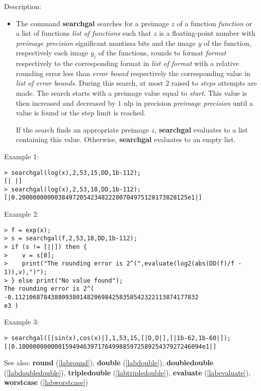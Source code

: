 \noindent Description: \begin{itemize}

\item The command \textbf{searchgal} searches for a preimage $z$ of a function
   \emph{function} or a list of functions \emph{list of functions} such that
   $z$ is a floating-point number with \emph{preimage precision}
   significant mantissa bits and the image $y$ of the function,
   respectively each image $y_i$ of the functions, rounds to
   format \emph{format} respectively to the corresponding format in \emph{list of format} 
   with a relative rounding error less than \emph{error bound}
   respectively the corresponding value in \emph{list of error bounds}. During
   this search, at most 2 raised to \emph{steps} attempts are made. The search
   starts with a preimage value equal to \emph{start}. This value is then
   increased and decreased by $1$ ulp in precision \emph{preimage precision} 
   until a value is found or the step limit is reached.
    
   If the search finds an appropriate preimage $z$, \textbf{searchgal}
   evaluates to a list containing this value. Otherwise, \textbf{searchgal}
   evaluates to an empty list.
\end{itemize}
\noindent Example 1: 
\begin{center}\begin{minipage}{15cm}\begin{Verbatim}[frame=single]
> searchgal(log(x),2,53,15,DD,1b-112);
[| |]
> searchgal(log(x),2,53,18,DD,1b-112);
[|0.20000000000384972054234822280704975128173828125e1|]
\end{Verbatim}
\end{minipage}\end{center}
\noindent Example 2: 
\begin{center}\begin{minipage}{15cm}\begin{Verbatim}[frame=single]
> f = exp(x);
> s = searchgal(f,2,53,18,DD,1b-112);
> if (s != [||]) then {
>    v = s[0];
>    print("The rounding error is 2^(",evaluate(log2(abs(DD(f)/f - 1)),v),")");
> } else print("No value found");
The rounding error is 2^( -0.112106878438809380148206984258358542322113874177832
e3 )
\end{Verbatim}
\end{minipage}\end{center}
\noindent Example 3: 
\begin{center}\begin{minipage}{15cm}\begin{Verbatim}[frame=single]
> searchgal([|sin(x),cos(x)|],1,53,15,[|D,D|],[|1b-62,1b-60|]);
[|0.100000000000159494639717649988597258925437927246094e1|]
\end{Verbatim}
\end{minipage}\end{center}
See also: \textbf{round} (\ref{labround}), \textbf{double} (\ref{labdouble}), \textbf{doubledouble} (\ref{labdoubledouble}), \textbf{tripledouble} (\ref{labtripledouble}), \textbf{evaluate} (\ref{labevaluate}), \textbf{worstcase} (\ref{labworstcase})

